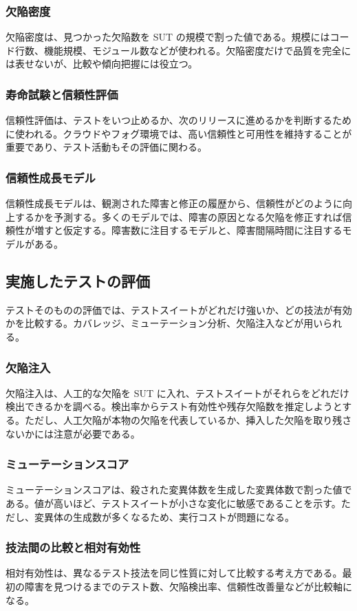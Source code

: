 \documentclass[uplatex,dvipdfmx,a4paper,11pt,nomag]{jsarticle}
\begin{document}
\subsubsection{欠陥密度}
欠陥密度は、見つかった欠陥数を SUT の規模で割った値である。規模にはコード行数、機能規模、モジュール数などが使われる。欠陥密度だけで品質を完全には表せないが、比較や傾向把握には役立つ。

\subsubsection{寿命試験と信頼性評価}
信頼性評価は、テストをいつ止めるか、次のリリースに進めるかを判断するために使われる。クラウドやフォグ環境では、高い信頼性と可用性を維持することが重要であり、テスト活動もその評価に関わる。

\subsubsection{信頼性成長モデル}
信頼性成長モデルは、観測された障害と修正の履歴から、信頼性がどのように向上するかを予測する。多くのモデルでは、障害の原因となる欠陥を修正すれば信頼性が増すと仮定する。障害数に注目するモデルと、障害間隔時間に注目するモデルがある。

\subsection{実施したテストの評価}
テストそのものの評価では、テストスイートがどれだけ強いか、どの技法が有効かを比較する。カバレッジ、ミューテーション分析、欠陥注入などが用いられる。

\subsubsection{欠陥注入}
欠陥注入は、人工的な欠陥を SUT に入れ、テストスイートがそれらをどれだけ検出できるかを調べる。検出率からテスト有効性や残存欠陥数を推定しようとする。ただし、人工欠陥が本物の欠陥を代表しているか、挿入した欠陥を取り残さないかには注意が必要である。

\subsubsection{ミューテーションスコア}
ミューテーションスコアは、殺された変異体数を生成した変異体数で割った値である。値が高いほど、テストスイートが小さな変化に敏感であることを示す。ただし、変異体の生成数が多くなるため、実行コストが問題になる。

\subsubsection{技法間の比較と相対有効性}
相対有効性は、異なるテスト技法を同じ性質に対して比較する考え方である。最初の障害を見つけるまでのテスト数、欠陥検出率、信頼性改善量などが比較軸になる。
\end{document}
